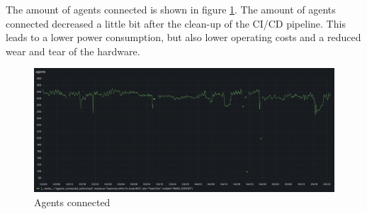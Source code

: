 The amount of agents connected is shown in figure \ref{fig:agents-connected}. 
The amount of agents connected decreased a little bit after the clean-up of the CI/CD pipeline. 
This leads to a lower power consumption, but also lower operating costs and a reduced wear and tear of the hardware.

\begin{figure}[htbp]
    \centering
    \includegraphics[width=\textwidth]{graphics/agents.png}
    \caption{Agents connected}
    \label{fig:agents-connected}
\end{figure}